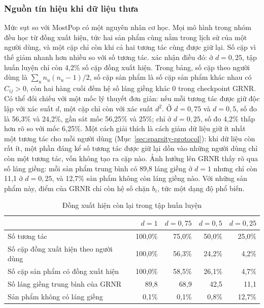 \FloatBarrier
\subsubsection{Nguồn tín hiệu khi dữ liệu thưa}

Mức sụt so với MostPop có một nguyên nhân cơ học. Mọi mô hình trong nhóm đều học từ đồng xuất hiện, tức hai sản phẩm cùng nằm trong lịch sử của một người dùng, và một cặp chỉ còn khi cả hai tương tác cùng được giữ lại. Số cặp vì thế giảm nhanh hơn nhiều so với số tương tác.  xác nhận điều đó: ở $d=0{,}25$, tập huấn luyện chỉ còn 4,2\% số cặp đồng xuất hiện. Trong bảng, số cặp theo người dùng là $\sum_u n_u(n_u-1)/2$, số cặp sản phẩm là số cặp sản phẩm khác nhau có $C_{ij}>0$, còn hai hàng cuối đếm hệ số láng giềng khác 0 trong checkpoint GRNR. Có thể đối chiếu với một mốc lý thuyết đơn giản: nếu mỗi tương tác được giữ độc lập với xác suất $d$, một cặp chỉ còn với xác suất $d^2$. Ở $d=0{,}75$ và $d=0{,}5$, số đo là 56,3\% và 24,2\%, gần sát mốc 56,25\% và 25\%; chỉ ở $d=0{,}25$, số đo 4,2\% thấp hơn rõ so với mốc 6,25\%. Một cách giải thích là cách giảm dữ liệu giữ ít nhất một tương tác cho mỗi người dùng (Mục~\ref{sec:sparsity-protocol}): khi dữ liệu còn rất ít, một phần đáng kể số tương tác được giữ lại dồn vào những người dùng chỉ còn một tương tác, vốn không tạo ra cặp nào. Ảnh hưởng lên GRNR thấy rõ qua số láng giềng: mỗi sản phẩm trung bình có 89,8 láng giềng ở $d=1$ nhưng chỉ còn 11,1 ở $d=0{,}25$, và 12,7\% sản phẩm không còn láng giềng nào. Với những sản phẩm này, điểm của GRNR chỉ còn hệ số chặn $b_i$, tức một dạng độ phổ biến.

\begin{table}[H]
\centering
\small
\begin{tabular}{@{}lrrrr@{}}
\toprule
& $d=1$ & $d=0{,}75$ & $d=0{,}5$ & $d=0{,}25$ \\
\midrule
Số tương tác & 100{,}0\% & 75{,}0\% & 50{,}0\% & 25{,}0\% \\
Số cặp đồng xuất hiện theo người dùng & 100{,}0\% & 56{,}3\% & 24{,}2\% & 4{,}2\% \\
Số cặp sản phẩm có đồng xuất hiện & 100{,}0\% & 58{,}5\% & 26{,}1\% & 4{,}7\% \\
\midrule
Số láng giềng trung bình của GRNR & 89{,}8 & 68{,}9 & 42{,}5 & 11{,}1 \\
Sản phẩm không có láng giềng & 0{,}1\% & 0{,}1\% & 0{,}8\% & 12{,}7\% \\
\bottomrule
\end{tabular}
\caption{Đồng xuất hiện còn lại trong tập huấn luyện}
\label{tab:cooccurrence}
\end{table}

